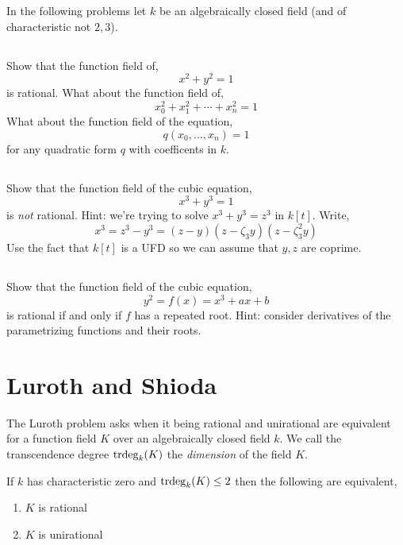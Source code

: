 \documentclass[12pt]{article}
\begin{document}
In the following problems let $k$ be an algebraically closed field (and of characteristic not $2,3$).

\subsection{}

Show that the function field of,
\[ x^2 + y^2 = 1 \]
is rational. What about the function field of,
\[ x^2_0 + x_1^2 + \cdots + x_n^2 = 1 \]
What about the function field of the equation,
\[ q(x_0, \dots, x_n) = 1 \]
for any quadratic form $q$ with coefficents in $k$.

\subsection{}

Show that the function field of the cubic equation,
\[ x^3 + y^3 = 1  \]
is \textit{not} rational. Hint: we're trying to solve $x^3 + y^3 = z^3$ in $k[t]$. Write,
\[ x^3 = z^3 - y^3 = (z - y)(z - \zeta_3 y)(z - \zeta_3^2 y) \]
Use the fact that $k[t]$ is a UFD so we can assume that $y,z$ are coprime.  

\subsection{}

Show that the function field of the cubic equation,
\[ y^2 = f(x) = x^3 + a x + b  \]
is rational if and only if $f$ has a repeated root. Hint: consider derivatives of the parametrizing functions and their roots.


\section{Luroth and Shioda}

The Luroth problem asks when it being rational and unirational are equivalent for a function field $K$ over an algebraically closed field $k$. We call the transcendence degree $\mathrm{trdeg}_{k}(K)$ the \textit{dimension} of the field $K$.

\begin{theorem}
If $k$ has characteristic zero and $\mathrm{trdeg}_{k}(K) \le 2$ then the following are equivalent,
\begin{enumerate}
\item $K$ is rational
\item $K$ is unirational
\end{enumerate} 
\end{theorem}
\end{document}
